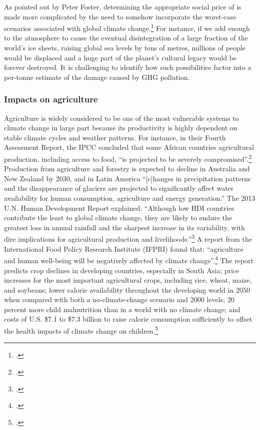 As pointed out by Peter Foster, determining the appropriate social price of  is made more complicated by the need to somehow incorporate the worst-case scenarios associated with global climate change.\footcite[][]{ApocExternal}
For instance, if we add enough  to the atmosphere to cause the eventual disintegration of a large fraction of the world's ice sheets, raising global sea levels by tens of metres, millions of people would be displaced and a huge part of the planet's cultural legacy would be forever destroyed.
It is challenging to identify how such possibilities factor into a per-tonne estimate of the damage caused by GHG pollution.



	\subsubsection{Impacts on agriculture}



Agriculture is widely considered to be one of the most vulnerable systems to climate change in large part because its productivity is highly dependent on stable climate cycles and weather patterns.
For instance, in their Fourth Assessment Report, the IPCC concluded that some African countries agricultural production, including access to food, ``is projected to be severely compromised''.\footcite[][See: Synthesis report, Table SPM.2. Examples of some projected regional impacts. \url{https://www.ipcc.ch/publications_and_data/ar4/syr/en/spms3.html}]{IPCC2007}
Production from agriculture and forestry is expected to decline in Australia and New Zealand by 2030, and in Latin America ``[c]hanges in precipitation patterns and the disappearance of glaciers are projected to significantly affect water availability for human consumption, agriculture and energy generation.''
The 2013 U.N. Human Development Report explained: ``Although low HDI countries contribute the least to global climate change, they are likely to endure the greatest loss in annual rainfall and the sharpest increase in its variability, with dire implications for agricultural production and livelihoods.''\footcite[][p. 6]{UNHumanDev2013}
A report from the International Food Policy Research Institute (IFPRI) found that: ``agriculture and human well-being will 
be negatively affected by climate change''.\footcite[][p. vii]{IFPRIAgri}
The report predicts crop declines in developing countries, especially in South Asia; price increases for the most important agricultural crops, including rice, wheat, maize, and soybeans; lower calorie availability throughout the developing world in 2050 when compared with both a no-climate-change scenario and 2000 levels; 20 percent more child malnutrition than in a world with no climate change; and costs of U.S. \$7.1 to \$7.3 billion to raise calorie consumption sufficiently to offset the health impacts of climate change on children.\footcite[][p. vii]{IFPRIAgri}



